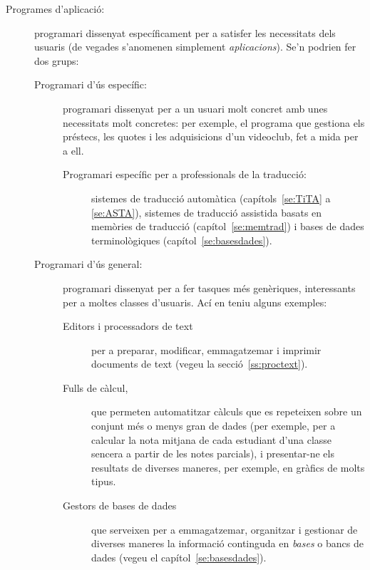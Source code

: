\begin{description}
\item[Programes d'aplicació:] programari dissenyat específicament per
  a satisfer les necessitats dels usuaris (de vegades s'anomenen
  simplement {\em aplicacions}). Se'n podrien fer dos grups:
  \begin{description}
  \item[Programari d'ús específic:] programari dissenyat per a un
    usuari molt concret amb unes necessitats molt concretes: per
    exemple, el programa que gestiona els préstecs, les quotes i les
    adquisicions d'un videoclub, fet a mida per a ell.
    \begin{description}
    \item[Programari específic per a professionals de la traducció:]
      sistemes de traducció automàtica (capítols~\ref{se:TiTA} a
      \ref{se:ASTA}), sistemes de traducció assistida basats en
      memòries de traducció (capítol~\ref{se:memtrad}) i bases de
      dades terminològiques (capítol~\ref{se:basesdades}).
    \end{description}
  \item[Programari d'ús general:] programari dissenyat per a fer
    tasques més genèriques, interessants per a moltes classes
    d'usuaris. Ací en teniu alguns exemples:
    \begin{description}
    \item[Editors i processadors de text] per a preparar, modificar,
      emmagatzemar i imprimir documents de text (vegeu la
      secció~\ref{ss:proctext}).
    \item[Fulls de càlcul,] que permeten automatitzar càlculs que es
      repeteixen sobre un conjunt més o menys gran de dades (per
      exemple, per a calcular la nota mitjana de cada estudiant d'una
      classe sencera a partir de les notes parcials), i presentar-ne
      els resultats de diverses maneres, per exemple, en gràfics de
      molts tipus.
    \item[Gestors de bases de dades] \label{pg:BD} que serveixen per a
      emmagatzemar, organitzar i gestionar de diverses maneres la
      informació continguda en \emph{bases} o bancs de dades (vegeu el
      capítol~\ref{se:basesdades}).

\end{description}
\end{description}
\end{description}
